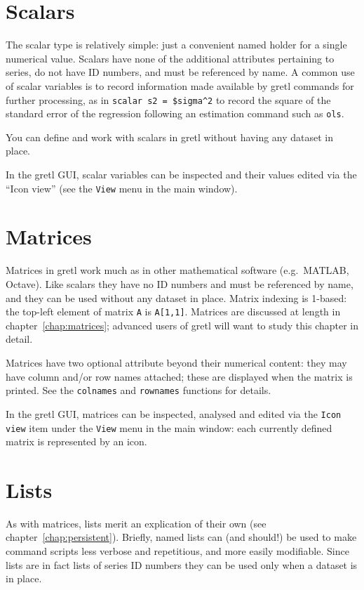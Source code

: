 \section{Scalars}
\label{sec:Scalars}

The scalar type is relatively simple: just a convenient named holder
for a single numerical value. Scalars have none of the additional
attributes pertaining to series, do not have ID numbers, and must be
referenced by name. A common use of scalar variables is to record
information made available by gretl commands for further processing,
as in \texttt{scalar s2 = \$sigma\^{}2} to record the square of the
standard error of the regression following an estimation command such
as \texttt{ols}.

You can define and work with scalars in gretl without having any
dataset in place.

In the gretl GUI, scalar variables can be inspected and their values
edited via the ``Icon view'' (see the \texttt{View} menu in the main
window).

\section{Matrices}
\label{sec:Matrices}

Matrices in gretl work much as in other mathematical software (e.g.\
\textsf{MATLAB}, \textsf{Octave}). Like scalars they have no ID
numbers and must be referenced by name, and they can be used without
any dataset in place. Matrix indexing is 1-based: the top-left element
of matrix \texttt{A} is \texttt{A[1,1]}.  Matrices are discussed at
length in chapter~\ref{chap:matrices}; advanced users of gretl will
want to study this chapter in detail.

Matrices have two optional attribute beyond their numerical content:
they may have column and/or row names attached; these are displayed
when the matrix is printed. See the \texttt{colnames} and
\texttt{rownames} functions for details.

In the gretl GUI, matrices can be inspected, analysed and edited via
the \texttt{Icon view} item under the \texttt{View} menu in the main
window: each currently defined matrix is represented by an icon.

\section{Lists}
\label{sec:Lists}

As with matrices, lists merit an explication of their own (see
chapter~\ref{chap:persistent}).  Briefly, named lists can (and
should!)  be used to make command scripts less verbose and
repetitious, and more easily modifiable. Since lists are in fact lists
of series ID numbers they can be used only when a dataset is in place.

